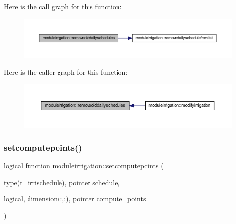 Here is the call graph for this function\+:\nopagebreak
\begin{figure}[H]
\begin{center}
\leavevmode
\includegraphics[width=350pt]{namespacemoduleirrigation_a80324762e72192acef959aaff9c21571_cgraph}
\end{center}
\end{figure}
Here is the caller graph for this function\+:\nopagebreak
\begin{figure}[H]
\begin{center}
\leavevmode
\includegraphics[width=350pt]{namespacemoduleirrigation_a80324762e72192acef959aaff9c21571_icgraph}
\end{center}
\end{figure}
\mbox{\label{namespacemoduleirrigation_a3c849d3ae9b8a9b5488e452d7fb9490e}} 
\subsubsection{\texorpdfstring{setcomputepoints()}{setcomputepoints()}}
{\footnotesize\ttfamily logical function moduleirrigation\+::setcomputepoints (\begin{DoxyParamCaption}\item[{type(\mbox{\hyperlink{structmoduleirrigation_1_1t__irrischedule}{t\+\_\+irrischedule}}), pointer}]{schedule,  }\item[{logical, dimension(\+:,\+:), pointer}]{compute\+\_\+points }\end{DoxyParamCaption})\hspace{0.3cm}{\ttfamily [private]}}

